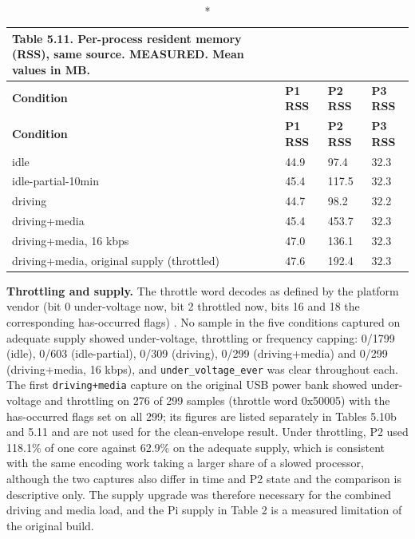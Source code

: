 \begin{center}
\begin{longtable}{|p{5cm}|l|l|l|}
\caption*{Table 5.11. Per-process resident memory (RSS), same source. MEASURED. Mean values in MB.}
\addcontentsline{lot}{table}{\protect\numberline{5.11}Per-process resident memory (RSS), same source. MEASURED. Mean values in MB.}
\\
\hline
\textbf{Condition} & \textbf{P1 RSS} & \textbf{P2 RSS} & \textbf{P3 RSS} \\
\hline
\endfirsthead
\hline
\textbf{Condition} & \textbf{P1 RSS} & \textbf{P2 RSS} & \textbf{P3 RSS} \\
\hline
\endhead
idle & 44.9 & 97.4 & 32.3 \\
\hline
idle-partial-10min & 45.4 & 117.5 & 32.3 \\
\hline
driving & 44.7 & 98.2 & 32.2 \\
\hline
driving+media & 45.4 & 453.7 & 32.3 \\
\hline
driving+media, 16 kbps & 47.0 & 136.1 & 32.3 \\
\hline
driving+media, original supply (throttled) & 47.6 & 192.4 & 32.3 \\
\hline
\end{longtable}
\end{center}

\textbf{Throttling and supply.} The throttle word decodes as defined by the platform vendor (bit 0 under-voltage now, bit 2 throttled now, bits 16 and 18 the corresponding has-occurred flags) \cite{rpi_docs}. No sample in the five conditions captured on adequate supply showed under-voltage, throttling or frequency capping: 0/1799 (idle), 0/603 (idle-partial), 0/309 (driving), 0/299 (driving+media) and 0/299 (driving+media, 16 kbps), and \texttt{under\_voltage\_ever} was clear throughout each. The first \texttt{driving+media} capture on the original USB power bank showed under-voltage and throttling on 276 of 299 samples (throttle word 0x50005) with the has-occurred flags set on all 299; its figures are listed separately in Tables 5.10b and 5.11 and are not used for the clean-envelope result. Under throttling, P2 used 118.1\% of one core against 62.9\% on the adequate supply, which is consistent with the same encoding work taking a larger share of a slowed processor, although the two captures also differ in time and P2 state and the comparison is descriptive only. The supply upgrade was therefore necessary for the combined driving and media load, and the Pi supply in Table 2 is a measured limitation of the original build.

